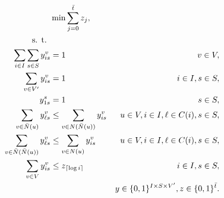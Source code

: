 \begin{subequations}\label{mod:partition}
\begin{align}
\notag &\min\sum\limits_{j=0}^{\bar{t}}z_j,\\
\notag \text{s. t. } \\
\label{mod:part:nodeBelongs} \sum\limits_{i\in I}\sum\limits_{s\in S}y^v_{is} & = 1 & v\in V,\\
\label{mod:part:treeHasIJ} \sum\limits_{v\in V'}y^v_{is} & = 1 & i\in I,s\in S,\\
\label{mod:part:source1} y_{1s}^s & = 1  & s\in S,\\
\label{mod:part:followArcsA}\sum\limits_{v\in \bar{N}(u)}y^v_{\ell s}&\leq \sum\limits_{v\in N(\bar{N}(u))}y_{is}^{v} & u\in V,i\in I,\ell\in C(i), s\in S,  \\
\label{mod:part:followArcsB}\sum\limits_{v\in \bar{N}(\bar{N}(u))}y^v_{\ell s}&\leq \sum\limits_{v\in N(u)} y_{is}^{v} & u\in V,i\in I,\ell\in C(i), s\in S,\\ 
\label{mod:part:yzrel}\sum\limits_{v\in V}y^v_{is} & \leq z_{\lceil\log i\rceil} & i\in I,s\in S,\\
\label{mod:part:dim}&&y \in \{0,1\}^{I\times S\times V'}, z\in \{0,1\}^{\bar{t}}.
\end{align}~
\end{subequations}

